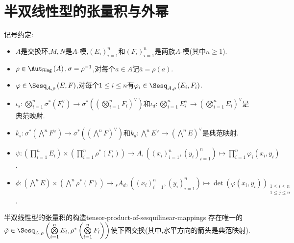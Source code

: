 \section{半双线性型的张量积与外幂}

记号约定:
\begin{itemize}
	\item $A$是交换环,$M,N$是$A$-模,$\left(E_{i}\right)_{i=1}^{n}$和$\left(F_{i}\right)_{i=1}^{n}$是两族$A$-模(其中$n\geq 1$).
	\item $\rho\in\Aut_{\mathsf{Ring}}\left(A\right),\sigma=\rho^{-1}$,对每个$a\in A$记$\bar{a}=\rho\left(a\right)$.
	\item $\varphi\in\Sesq_{A,\rho}\left(E,F\right)$,对每个$1\leq i\leq n$有$\varphi_{i}\in\Sesq_{A,\rho}\left(E_{i},F_{i}\right)$.
	\item $\iota_{s}:\bigotimes\limits_{i=1}^{n}\sigma^{\ast}\left(F_{i}^{\vee}\right)\to\sigma^{\ast}\left(\left(\bigotimes\limits_{i=1}^{n}F_{i}\right)^{\vee}\right)$和$\iota_{d}:\bigotimes\limits_{i=1}^{n}E_{i}^{\vee}\to\left(\bigotimes\limits_{i=1}^{n}E_{i}\right)^{\vee}$是典范映射.
	\item $k_{s}:\sigma^{\ast}\left(\bigwedge\limits^{n}F^{\vee}\right)\to\sigma^{\ast}\left(\left(\bigwedge\limits^{n}F\right)^{\vee}\right)$和$k_{d}:\bigwedge\limits^{n}E^{\vee}\to\left(\bigwedge\limits^{n}E\right)^{\vee}$是典范映射.
	\item $\psi:\left(\prod\limits_{i=1}^{n}E_{i}\right)\times\left(\prod\limits_{i=1}^{n}\rho^{\ast}\left(F_{i}\right)\right)\to A,\left(\left(x_{i}\right)_{i=1}^{n},\left(y_{i}\right)_{i=1}^{n}\right)\mapsto\prod\limits_{i=1}^{n}\varphi_{i}\left(x_{i},y_{i}\right)$.
	\item $\phi:\left(\bigwedge\limits^{n}E\right)\times\left(\bigwedge\limits^{n}\rho^{\ast}\left(F\right)\right)\to{}_{s}A_{d},\left(\left(x_{i}\right)_{i=1}^{n},\left(y_{i}\right)_{i=1}^{n}\right)\mapsto\det\left(\varphi\left(x_{i},y_{i}\right)\right)_{\substack{1\leq i\leq n\\
	 1\leq j\leq n}}$.
\end{itemize}

\begin{proposition}{半双线性型的张量积的构造}{tensor-product-of-sesquilinear-mappings}
	存在唯一的$\bar{\varphi}\in\Sesq_{A,\rho}\left(\bigotimes\limits_{i=1}^{n}E_{i},\rho^{\ast}\left(\bigotimes\limits_{i=1}^{n}F_{i}\right)\right)$使下图交换(其中,水平方向的箭头是典范映射).
	\begin{center}
	\end{center}
\end{proposition}

